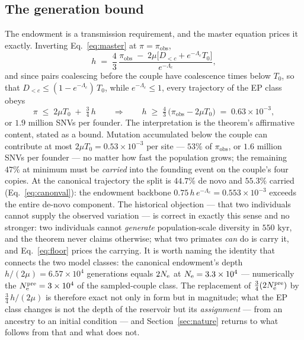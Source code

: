 \subsection{The generation bound}\label{sec:bound}
The endowment is a transmission requirement, and the master equation prices
it exactly. Inverting Eq.~\eqref{eq:master} at $\pi = \pi_{\mathrm{obs}}$,
\begin{equation}\label{eq:hreq}
h \;=\; \frac{4}{3}\,\frac{\pi_{\mathrm{obs}} \;-\;
2\mu\bigl[D_{<c} + e^{-\Lambda_c}T_0\bigr]}{e^{-\Lambda_c}} ,
\end{equation}
and since pairs coalescing before the couple have coalescence times below
$T_0$, so that $D_{<c} \le (1-e^{-\Lambda_c})\,T_0$, while
$e^{-\Lambda_c} \le 1$, every trajectory of the EP class obeys
\begin{equation}\label{eq:floor}
\pi \;\le\; 2\mu T_0 \;+\; \tfrac{3}{4}\,h
\qquad\Longrightarrow\qquad
h \;\ge\; \tfrac{4}{3}\,\bigl(\pi_{\mathrm{obs}} - 2\mu T_0\bigr)
\;=\; 0.63\times10^{-3},
\end{equation}
or $1.9$ million SNVs per founder. The interpretation is the theorem's
affirmative content, stated as a bound. Mutation accumulated below the
couple can contribute at most $2\mu T_0 = 0.53\times10^{-3}$ per site ---
$53\%$ of $\pi_{\mathrm{obs}}$, or $1.6$ million SNVs per founder --- no
matter how fast the population grows; the remaining $47\%$ at minimum must
be \emph{carried} into the founding event on the couple's four copies. At
the canonical trajectory the split is $44.7\%$ de novo and $55.3\%$ carried
(Eq.~\eqref{eq:canonval}): the endowment backbone
$0.75\,h\,e^{-\Lambda_c} = 0.553\times10^{-3}$ exceeds the entire de-novo
component. The historical objection --- that two individuals cannot supply
the observed variation --- is correct in exactly this sense and no
stronger: two individuals cannot \emph{generate} population-scale diversity
in $550$ kyr, and the theorem never claims otherwise; what two primates
\emph{can} do is carry it, and Eq.~\eqref{eq:floor} prices the carrying.
It is worth naming the identity that connects the two model classes: the
canonical endowment's depth $h/(2\mu) = 6.57\times10^{4}$ generations
equals $2N_{\mathrm{e}}$ at $N_{\mathrm{e}} = 3.3\times10^{4}$ --- numerically the
$N_{\mathrm{e}}^{\mathrm{pre}} = 3\times10^{4}$ of the sampled-couple class. The replacement of
$\tfrac34(2N_{\mathrm{e}}^{\mathrm{pre}})$ by $\tfrac34\,h/(2\mu)$ is therefore exact not only in
form but in magnitude; what the EP class changes is not the depth of the
reservoir but its \emph{assignment} --- from an ancestry to an initial
condition --- and Section~\ref{sec:nature} returns to what follows from
that and what does not.

